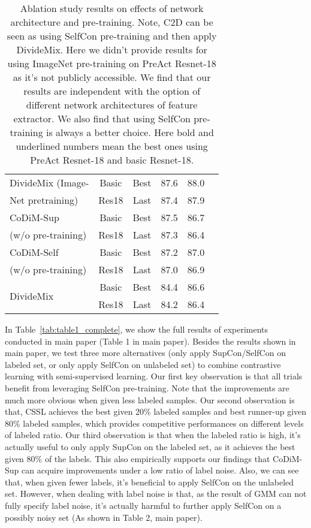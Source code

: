 \documentclass[letterpaper]{article} \usepackage{aaai22}  \usepackage{times}  \usepackage{helvet}  \usepackage{courier}  \usepackage[hyphens]{url}  \usepackage{graphicx} \usepackage{subfigure}
\begin{document}
\begin{table}[ht]
\begin{center}
\begin{tabular}{lccccc}
\hline
DivideMix (Image- & Basic & Best & 87.6 & 88.0 \\
Net pretraining) &  Res18 & Last & 87.4 & 87.9 \\
\hline
CoDiM-Sup & Basic  & Best & 87.5 & 86.7 \\
(w/o pre-training) & Res18 & Last & 87.3 & 86.4 \\
\hline
CoDiM-Self & Basic  & Best & 87.2 & 87.0 \\
(w/o pre-training) & Res18 & Last & 87.0 & 86.9 \\
\hline
\multirow{2}{*}{DivideMix} & Basic & Best & 84.4 & 86.6 \\
& Res18 & Last & 84.2 & 86.4 \\
\hline
\end{tabular}
\end{center}
\caption{Ablation study results on effects of network architecture and pre-training. Note, C2D can be seen as using SelfCon pre-training and then apply DivideMix. Here we didn't provide results for using ImageNet pre-training on PreAct Resnet-18 as it's not publicly accessible. We find that our results are independent with the option of different network architectures of feature extractor. We also find that using SelfCon pre-training is always a better choice. Here bold and underlined numbers mean the best ones using PreAct Resnet-18 and basic Resnet-18.}
\label{tab:table6_app}
\end{table}

In Table~\ref{tab:table1_complete}, we show the full results of experiments conducted in main paper (Table 1 in main paper). Besides the results shown in main paper, we test three more alternatives (only apply SupCon/SelfCon on labeled set, or only apply SelfCon on unlabeled set) to combine contrastive learning with semi-supervised learning. Our first key observation is that all trials benefit from leveraging SelfCon pre-training. Note that the improvements are much more obvious when given less labeled samples. Our second observation is that, CSSL achieves the best given 20\% labeled samples and best runner-up given 80\% labeled samples, which provides competitive performances on different levels of labeled ratio. Our third observation is that when the labeled ratio is high, it's actually useful to only apply SupCon on the labeled set, as it achieves the best given 80\% of the labels. This also empirically supports our findings that CoDiM-Sup can acquire improvements under a low ratio of label noise. Also, we can see that, when given fewer labels, it's beneficial to apply SelfCon on the unlabeled set. However, when dealing with label noise is that, as the result of GMM can not fully specify label noise, it's actually harmful to further apply SelfCon on a possibly noisy set (As shown in Table 2, main paper).
\end{document}
